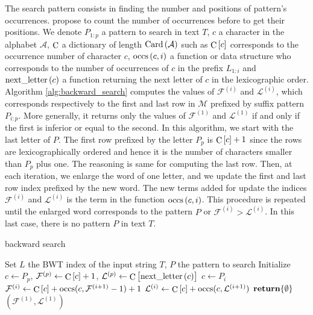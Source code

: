 \documentclass[11pt,twoside]{article}
\theoremstyle{definition}
\def\func#1{\mathop{\rm #1}}
\def\card{\func{Card}\nolimits}
\def\first{\mathcal{F}}
\def\last{\mathcal{L}}
\def\counts{\func{C}\nolimits}
\def\occs{\func{occs}\nolimits}
\def\next{\func{next\_letter}\nolimits}
\begin{document}
The search pattern consists in finding the number and positions of pattern's occurrences. \citet{Ferragina-2005} propose to count the number of occurrences before to get their positions. We denote $P_{1:p}$ a pattern to search in text $T$, $c$ a character in the alphabet $\mathcal{A}$, $\counts$ a dictionary of length $\card\left(\mathcal{A}\right)$ such as $\counts\left[c\right]$ corresponds to the occurrence number of character $c$, $\occs\left(c, i\right)$ a function or data structure who corresponds to the number of occurrences of $c$ in the prefix $L_{1:i}$ and $\next\left(c\right)$ a function returning the next letter of $c$ in the lexicographic order. Algorithm \ref{alg:backward_search} computes the values of $\first^{\left(i\right)}$ and $\last^{\left(i\right)}$, which corresponds respectively to the first and last row in $\mathcal{M}$ prefixed by suffix pattern $P_{i:p}$. More generally, it returns only the values of $\first^{\left(1\right)}$ and $\last^{\left(1\right)}$ if and only if the first is inferior or equal to the second. In this algorithm, we start with the last letter of $P$. The first row prefixed by the letter $P_{p}$ is $\counts\left[c\right] + 1$ since the rows are lexicographically ordered and hence it is the number of characters smaller than $P_{p}$ plus one. The reasoning is same for computing the last row. Then, at each iteration, we enlarge the word of one letter, and we update the first and last row index prefixed by the new word. The new terms added for update the indices $\first^{\left(i\right)}$ and $\last^{\left(i\right)}$ is the term in the function $\occs\left(c, i\right)$. This procedure is repeated until the enlarged word corresponds to the pattern $P$ or $\first^{\left(i\right)} > \last^{\left(i\right)}$. In this last case, there is no pattern $P$ in text $T$.

\begin{algorithm}[h]
\caption{backward search}
\label{alg:backward_search}
\begin{algorithmic}
\State Set $L$ the BWT index of the input string $T$, $P$ the pattern to search
\State Initialize $c \leftarrow P_p$, $\first^{\left(p\right)} \leftarrow \counts\left[c\right] + 1$, $\last^{\left(p\right)} \leftarrow \counts\left[\next\left(c\right)\right]$
  \State $c \leftarrow P_{i}$
  \State $\first^{\left(i\right)} \leftarrow \counts\left[c\right] + \occs(c, \first^{\left(i+1\right)}-1) + 1$
  \State $\last^{\left(i\right)} \leftarrow \counts\left[c\right] + \occs(c, \last^{\left(i+1\right)})$
  \If {$\first^{\left(i\right)} > \last^{\left(i\right)}$}
    \State $\Return \{\emptyset\}$
  \EndIf
\EndFor
\State \Return $\left(\first^{\left(1\right)}, \last^{\left(1\right)}\right)$
\end{algorithmic}
\end{algorithm}
\end{document}
